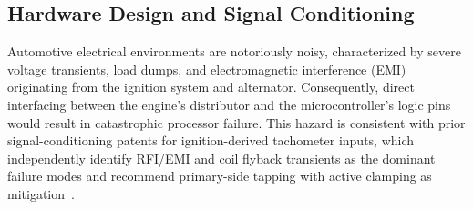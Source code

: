 \documentclass[journal, twocolumn]{IEEEtran}
\begin{document}
\subsection{Hardware Design and Signal Conditioning}
Automotive electrical environments are notoriously noisy, characterized by severe voltage transients, load dumps, and electromagnetic interference (EMI) originating from the ignition system and alternator. Consequently, direct interfacing between the engine's distributor and the microcontroller's logic pins would result in catastrophic processor failure. This hazard is consistent with prior signal-conditioning patents for ignition-derived tachometer inputs, which independently identify RFI/EMI and coil flyback transients as the dominant failure modes and recommend primary-side tapping with active clamping as mitigation~\cite{signalcond1990}.
\end{document}
